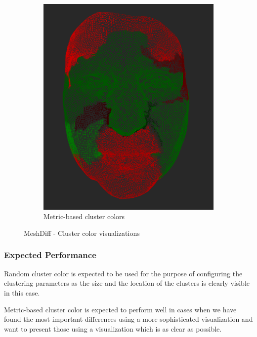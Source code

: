\begin{figure}[h]
\begin{subfigure}{0.3\textwidth}
	\includegraphics[width=\textwidth]{./img/meshdiff-clustercolor-metric.PNG}
    \caption{Metric-based cluster colors}
    \label{fig:meshdiff_clustercolor_metric}
	\end{subfigure}
    
\caption{MeshDiff - Cluster color visualizations}
\end{figure}

\subsubsection{Expected Performance}

Random cluster color is expected to be used for the purpose of configuring the clustering parameters as the size and the location of the clusters is clearly visible in this case.

Metric-based cluster color is expected to perform well in cases when we have found the most important differences using a more sophisticated visualization and want to present those using a visualization which is as clear as possible.
